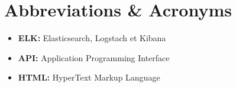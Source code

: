 \chapter*{Abbreviations \& Acronyms}

\begin{itemize}
	\item \textbf{ELK:}  Elasticsearch, Logstach et Kibana
	\item \textbf{API:}  Application Programming Interface
	\item \textbf{HTML:}  HyperText Markup Language
\end{itemize}